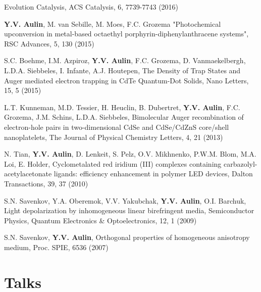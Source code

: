 \documentclass[11pt,letterpaper,sans]{moderncv} %
\begin{document}
\begin{etaremune}
              Evolution Catalysis, ACS Catalysis, 6, 7739-7743 (2016)
        \item \textbf{Y.V. Aulin}, M. van Sebille, M. Moes, F.C. Grozema 
              "Photochemical upconversion in metal-based octaethyl 
              porphyrin-diphenylanthracene systems", RSC Advances, 5, 130 (2015)
        \item S.C. Boehme, I.M. Azpiroz, \textbf{Y.V. Aulin}, F.C. Grozema, 
              D. Vanmaekelbergh, L.D.A. Siebbeles, I. Infante, A.J. Houtepen,
              The Density of Trap States and Auger mediated electron trapping 
              in CdTe Quantum-Dot Solids, Nano Letters, 15, 5 (2015)
        \item L.T. Kunneman, M.D. Tessier, H. Heuclin, B. Dubertret,
              \textbf{Y.V. Aulin}, F.C. Grozema, J.M. Schins, L.D.A. Siebbeles,
              Bimolecular Auger recombination of electron-hole pairs 
              in two-dimensional CdSe and CdSe/CdZnS core/shell nanoplatelets,
              The Journal of Physical Chemistry Letters, 4, 21 (2013)
        \item N. Tian, \textbf{Y.V. Aulin}, D. Lenkeit, S. Pelz, O.V. Mikhnenko, 
              P.W.M. Blom, M.A. Loi, E. Holder, Cyclometalated red iridium (III) 
              complexes containing carbazolyl-acetylacetonate ligands: 
              efficiency enhancement in polymer LED devices, 
              Dalton Transactions, 39, 37 (2010)
        \item S.N. Savenkov, Y.A. Oberemok, V.V. Yakubchak, \textbf{Y.V. Aulin}, O.I. Barchuk,
              Light depolarization by inhomogeneous linear birefringent media, 
              Semiconductor Physics, Quantum Electronics \& Optoelectronics,
              12, 1 (2009)
        \item S.N. Savenkov, \textbf{Y.V. Aulin},
              Orthogonal properties of homogeneous anisotropy medium,
              Proc. SPIE, 6536 (2007)
\end{etaremune}





\section {Talks}
\end{document}
